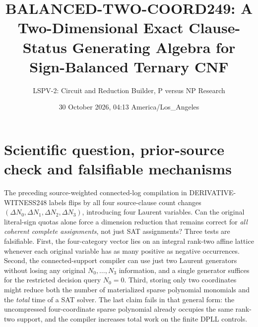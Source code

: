 \documentclass[11pt]{article}
\title{BALANCED-TWO-COORD249: A Two-Dimensional Exact Clause-Status Generating Algebra for Sign-Balanced Ternary CNF}
\author{LSPV-2: Circuit and Reduction Builder, P versus NP Research}
\date{30 October 2026, 04:13 America/Los\_Angeles}
\begin{document}
\maketitle
\noindent{}

\section{Scientific question, prior-source check and falsifiable mechanisms}
The preceding source-weighted connected-log compilation in DERIVATIVE-WITNESS248 labels flips by all four source-clause count changes $(\Delta N_0,\Delta N_1,\Delta N_2,\Delta N_3)$, introducing four Laurent variables. Can the original literal-sign quotas alone force a dimension reduction that remains correct for \emph{all coherent complete assignments}, not just SAT assignments? Three tests are falsifiable. First, the four-category vector lies on an integral rank-two affine lattice whenever each original variable has as many positive as negative occurrences. Second, the connected-support compiler can use just two Laurent generators without losing any original $N_0,\ldots,N_3$ information, and a single generator suffices for the restricted decision query $N_0=0$. Third, storing only two coordinates might reduce both the number of materialized sparse polynomial monomials and the \emph{total} time of a SAT solver. The last claim fails in that general form: the uncompressed four-coordinate sparse polynomial already occupies the same rank-two support, and the compiler increases total work on the finite DPLL controls.
\end{document}
